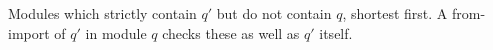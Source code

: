 Modules which strictly contain $q'$ but do not contain $q$, shortest first. A from-import of $q'$ in
module $q$ checks these as well as $q'$ itself.
